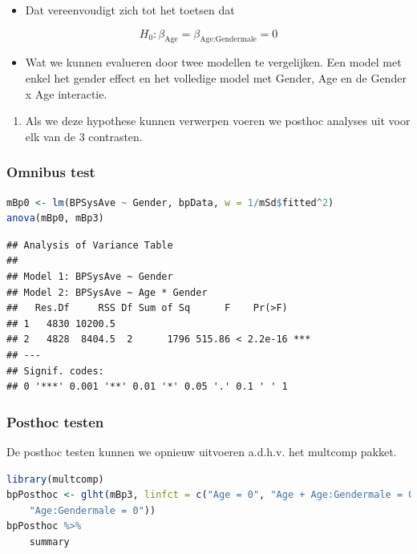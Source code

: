 \documentclass[
  12pt,dutch,coursenotes]{book}
\providecommand{\tightlist}{%
  \setlength{\itemsep}{0pt}\setlength{\parskip}{0pt}}
\begin{document}
\begin{itemize}
\tightlist
\item
  Dat vereenvoudigt zich tot het toetsen dat
\end{itemize}

\[
H_0: \beta_\text{Age} = \beta_\text{Age:Gendermale} = 0
\]

\begin{itemize}
\tightlist
\item
  Wat we kunnen evalueren door twee modellen te vergelijken. Een model met enkel het gender effect en het volledige model met Gender, Age en de Gender x Age interactie.
\end{itemize}

\begin{enumerate}
\def\labelenumi{\arabic{enumi}.}
\setcounter{enumi}{1}
\tightlist
\item
  Als we deze hypothese kunnen verwerpen voeren we posthoc analyses uit voor elk van de 3 contrasten.
\end{enumerate}

\hypertarget{omnibus-test}{%
\subsubsection{Omnibus test}\label{omnibus-test}}

\begin{lstlisting}[language=R]
mBp0 <- lm(BPSysAve ~ Gender, bpData, w = 1/mSd$fitted^2)
anova(mBp0, mBp3)
\end{lstlisting}

\begin{lstlisting}
## Analysis of Variance Table
## 
## Model 1: BPSysAve ~ Gender
## Model 2: BPSysAve ~ Age * Gender
##   Res.Df     RSS Df Sum of Sq      F    Pr(>F)    
## 1   4830 10200.5                                  
## 2   4828  8404.5  2      1796 515.86 < 2.2e-16 ***
## ---
## Signif. codes:  
## 0 '***' 0.001 '**' 0.01 '*' 0.05 '.' 0.1 ' ' 1
\end{lstlisting}

\hypertarget{posthoc-testen}{%
\subsubsection{Posthoc testen}\label{posthoc-testen}}

De posthoc testen kunnen we opnieuw uitvoeren a.d.h.v. het multcomp pakket.

\begin{lstlisting}[language=R]
library(multcomp)
bpPosthoc <- glht(mBp3, linfct = c("Age = 0", "Age + Age:Gendermale = 0",
    "Age:Gendermale = 0"))
bpPosthoc %>%
    summary
\end{lstlisting}
\end{document}
